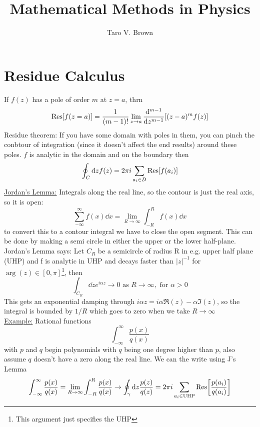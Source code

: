 \documentclass[a4paper,12pt]{article}
\title{Mathematical Methods in Physics}
\author[a]{Taro V. Brown}
\affiliation[a]{Department of Physics, UC Davis, One Shields Avenue, Davis, CA 95616, USA }
\begin{document}
 
\maketitle
\flushbottom
\tableofcontents
\newpage
\section{Residue Calculus}
If $f(z)$ has a pole of order $m$ at $z=a$, thrn
\begin{equation}
\Res[f(z=a)]=\frac{1}{(m-1)!}\lim_{z\to a}\dv[m-1]{}{z}[(z-a)^mf(z)]
\end{equation}
Residue theorem:
If you have some domain with poles in them, you can pinch the conbtour of integration (since it doesn't affect the end results) around these poles. $f$ is analytic in the domain and on the boundary then
\begin{equation}
\oint _C \dd z  f(z)=2\pi i \sum_{a_i\in D}\Res[f(a_i)]\end{equation}
\underline{Jordan's Lemma:} Integrals along the real line, so the contour is just the real axis, so it is open:
\begin{equation}
	\sum_{-\infty}^{\infty}f(x)\dd x= \lim_{R\to \infty }\int_{-R}^{R}f(x)\dd x
\end{equation}
to convert this to a contour integral we have to close the open segment. This can be done by making a semi circle in either the upper or the lower half-plane.
\\
Jordan's Lemma says:
Let $C_R$ be a semicircle of radius R in e.g. upper half plane (UHP) and f is analytic in UHP and decays faster than $|z|^{-1}$ for $\arg(z)\in [0,\pi]$\footnote{This argument just specifies the UHP}, then
\begin{equation}
	\int_{C_R} \dd z e^{i\alpha z}\to 0 \text{ as } R\to \infty, \text{ for } \alpha > 0
\end{equation}
This gets an exponential damping through $i\alpha z=i\alpha \Re (z)-\alpha \Im(z)$, so the integral is bounded by $1/R$ which goes to zero when we take $R\to \infty$\\
\underline{Example:}
Rational functions
\begin{equation}
\int_{-\infty}^{\infty}\frac{p(x)}{q(x)}
\end{equation}
with $p$ and $q$ begin polynomials with $q$ being one degree higher than $p$, also assume $q$ doesn't have a zero along the real line. We can the write using J's Lemma
\begin{equation}
	\int_{-\infty}^{\infty}\frac{p(x)}{q(x)}=\lim_{R\to \infty}\int_{-R}^{R}\frac{p(x)}{q(x)}\to \oint_\gamma \dd z\frac{p(z)}{q(z)}=2\pi i \sum_{a_i\in\text{UHP}}\Res[\frac{p(a_i)}{q(a_i)}]
\end{equation}
\end{document}
